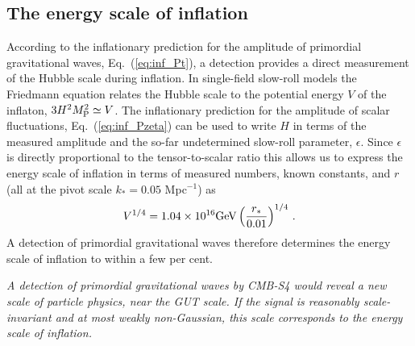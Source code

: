 \subsection{The energy scale of inflation}
\label{sec:scale-of-inflation}
According to the inflationary prediction for the amplitude of primordial gravitational waves, Eq.~(\ref{eq:inf_Pt}), a detection provides a direct measurement of the Hubble scale during inflation. In single-field slow-roll models the Friedmann equation relates the Hubble scale to the potential energy $V$ of the inflaton, $3H^2M_{\rm P}^2\simeq V$. The inflationary prediction for the amplitude of scalar fluctuations, Eq.~(\ref{eq:inf_Pzeta}) can be used to write $H$ in terms of the measured amplitude and the so-far undetermined slow-roll parameter, $\epsilon$. Since $\epsilon$ is directly proportional to the tensor-to-scalar ratio this allows us to express the energy scale of inflation in terms of measured numbers, known constants, and $r$ (all at the pivot scale $k_\ast=0.05$ Mpc$^{-1}$) as
\begin{equation}\label{eq:Vofr}
V^{1/4}=1.04\times 10^{16}{\rm GeV}\left(\frac{r_\ast}{0.01}\right)^{1/4}\,.
\end{equation}
A detection of primordial gravitational waves therefore determines the energy scale of inflation to within a few per cent. 

{\it A detection of primordial gravitational waves by CMB-S4 would reveal a new scale of particle physics, near the GUT scale. If the signal is reasonably scale-invariant and at most weakly non-Gaussian, this scale corresponds to the energy scale of inflation.} 


%
